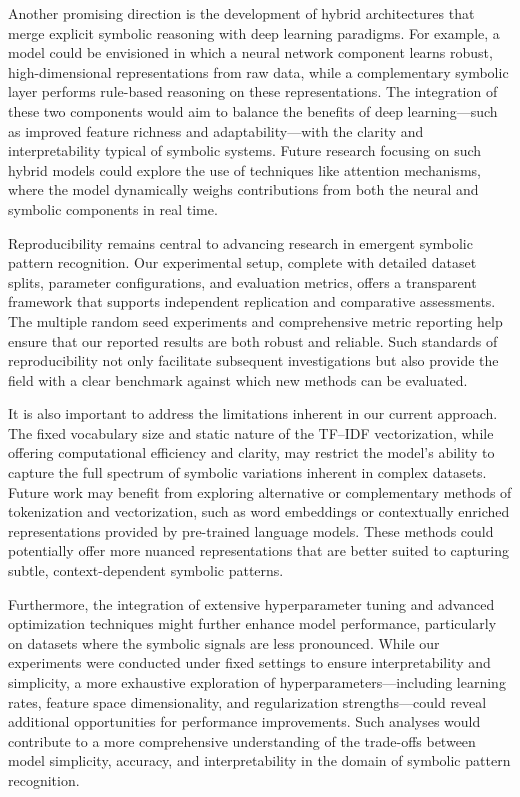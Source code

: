 \documentclass{article}
\begin{document}
Another promising direction is the development of hybrid architectures that merge explicit symbolic reasoning with deep learning paradigms. For example, a model could be envisioned in which a neural network component learns robust, high-dimensional representations from raw data, while a complementary symbolic layer performs rule-based reasoning on these representations. The integration of these two components would aim to balance the benefits of deep learning—such as improved feature richness and adaptability—with the clarity and interpretability typical of symbolic systems. Future research focusing on such hybrid models could explore the use of techniques like attention mechanisms, where the model dynamically weighs contributions from both the neural and symbolic components in real time.

Reproducibility remains central to advancing research in emergent symbolic pattern recognition. Our experimental setup, complete with detailed dataset splits, parameter configurations, and evaluation metrics, offers a transparent framework that supports independent replication and comparative assessments. The multiple random seed experiments and comprehensive metric reporting help ensure that our reported results are both robust and reliable. Such standards of reproducibility not only facilitate subsequent investigations but also provide the field with a clear benchmark against which new methods can be evaluated.

It is also important to address the limitations inherent in our current approach. The fixed vocabulary size and static nature of the TF–IDF vectorization, while offering computational efficiency and clarity, may restrict the model’s ability to capture the full spectrum of symbolic variations inherent in complex datasets. Future work may benefit from exploring alternative or complementary methods of tokenization and vectorization, such as word embeddings or contextually enriched representations provided by pre-trained language models. These methods could potentially offer more nuanced representations that are better suited to capturing subtle, context-dependent symbolic patterns.

Furthermore, the integration of extensive hyperparameter tuning and advanced optimization techniques might further enhance model performance, particularly on datasets where the symbolic signals are less pronounced. While our experiments were conducted under fixed settings to ensure interpretability and simplicity, a more exhaustive exploration of hyperparameters—including learning rates, feature space dimensionality, and regularization strengths—could reveal additional opportunities for performance improvements. Such analyses would contribute to a more comprehensive understanding of the trade-offs between model simplicity, accuracy, and interpretability in the domain of symbolic pattern recognition.
\end{document}
